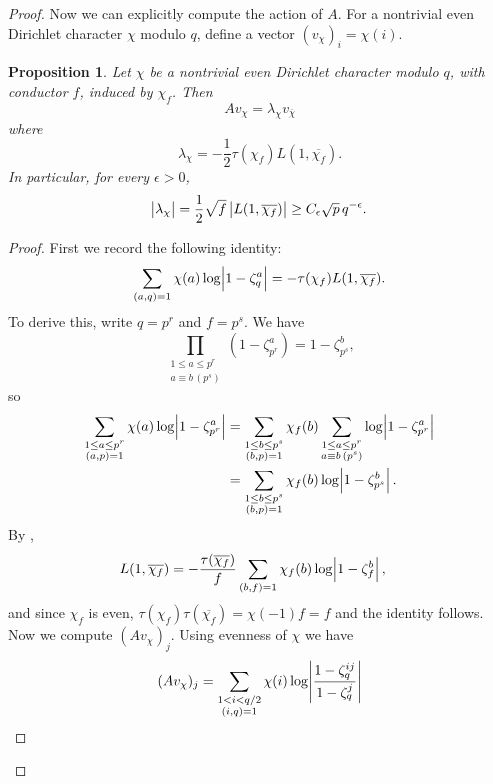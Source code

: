 \documentclass[10pt,a4paper]{amsart}
\newtheorem{prop}{Proposition}
\begin{document}
\begin{proof}
Now we can explicitly compute the action of $A$. For a nontrivial even Dirichlet character $\chi$ modulo $q$, define a vector $(v_\chi)_i = \chi(i)$.
\begin{prop}
    Let $\chi$ be a nontrivial even Dirichlet character modulo $q$, with conductor $f$, induced by $\chi_f$. Then
    \[
    A v_\chi = \lambda_\chi v_{\overline{\chi}}
    \]
    where
    \[
    \lambda_\chi
    =
    -\frac{1}{2}\tau(\chi_f)L(1,\overline{\chi_f}).
    \]
    In particular, for every $\epsilon > 0$,
    \[
    \abs{\lambda_\chi}
    =
    \frac{1}{2}\sqrt{f}\,\abs{L(1,\overline{\chi_f})}
    \geq C_\epsilon \sqrt{p}\, q^{-\epsilon}.
    \]
\end{prop}
\begin{proof}
First we record the following identity:
    \begin{align*}
    \sum_{(a,q) = 1} \chi(a) \log\abs{1-\zeta_q^a}
    =
    -\tau(\chi_f)
    L(1,\overline{\chi_f}).
    \end{align*}
    To derive this, write $q=p^r$ and $f=p^s$. We have
    \[
    \prod_{\substack{1 \leq a \leq p^r \\ a \equiv b \, (p^s)}} (1-\zeta_{p^r}^a)=1-\zeta_{p^s}^b,
    \]
    so
    \begin{align*}
    \sum_{\substack{1 \leq a \leq p^r \\ (a,p)=1}}\chi(a)\log\abs{1-\zeta_{p^r}^a}
    &=
    \sum_{\substack{1 \leq b \leq p^s \\ (b,p)=1}}
    \chi_f(b)
    \sum_{\substack{1 \leq a \leq p^r \\ a \equiv b \, (p^s)}}
    \log\abs{1-\zeta_{p^r}^a}
    \\
    &=
    \sum_{\substack{1 \leq b \leq p^s \\ (b,p)=1}}
    \chi_f(b)\log\abs{1-\zeta_{p^s}^b}.
    \end{align*}
    By \cite[Theorem 4.9]{Washington1997},
    \begin{align*}
    L(1,\overline{\chi_f})
    &=
    -\frac{\tau(\overline{\chi_f})}{f}
    \sum_{(b,f)=1}\chi_f(b)\log\abs{1-\zeta_f^b},
    \end{align*}
    and since $\chi_f$ is even, $\tau(\chi_f)\tau(\overline{\chi_f}) = \chi(-1)f = f$ and the identity follows.
Now we compute $(A v_\chi)_j$. Using evenness of $\chi$ we have
\begin{align*}
(A v_\chi)_j
&=
\sum_{\substack{1 < i < q/2 \\ (i,q) = 1}}
\chi(i)
\log \abs{\frac{1-\zeta_q^{ij}}{1-\zeta_q^j}}
\\

\end{align*}
\end{proof}
\end{proof}
\end{document}
